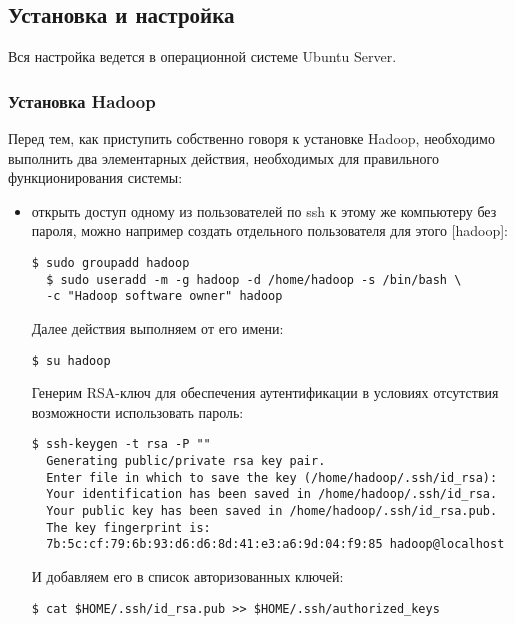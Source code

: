 \subsection{Установка и настройка}

Вся настройка ведется в операционной системе Ubuntu Server.

\subsubsection{Установка Hadoop}

Перед тем, как приступить собственно говоря к установке Hadoop, необходимо выполнить два элементарных действия, необходимых для правильного функционирования системы:

\begin{itemize}
  \item открыть доступ одному из пользователей по ssh к этому же компьютеру без пароля, можно например создать отдельного пользователя для этого [hadoop]:

  \begin{lstlisting}[label=lst:haddop1,caption=Создаем пользователя с правами]
  $ sudo groupadd hadoop
  $ sudo useradd -m -g hadoop -d /home/hadoop -s /bin/bash \
  -c "Hadoop software owner" hadoop
  \end{lstlisting}

  Далее действия выполняем от его имени:

  \begin{lstlisting}[label=lst:haddop2,caption=Логинимся под пользователем hadoop]
  $ su hadoop
  \end{lstlisting}

  Генерим RSA-ключ для обеспечения аутентификации в условиях отсутствия возможности использовать пароль:

  \begin{lstlisting}[label=lst:haddop3,caption=Генерим RSA-ключ]
  $ ssh-keygen -t rsa -P ""
  Generating public/private rsa key pair.
  Enter file in which to save the key (/home/hadoop/.ssh/id_rsa):
  Your identification has been saved in /home/hadoop/.ssh/id_rsa.
  Your public key has been saved in /home/hadoop/.ssh/id_rsa.pub.
  The key fingerprint is:
  7b:5c:cf:79:6b:93:d6:d6:8d:41:e3:a6:9d:04:f9:85 hadoop@localhost
  \end{lstlisting}

  И добавляем его в список авторизованных ключей:

  \begin{lstlisting}[label=lst:haddop4,caption=Добавляем его в список авторизованных ключей]
  $ cat $HOME/.ssh/id_rsa.pub >> $HOME/.ssh/authorized_keys
  \end{lstlisting}


\end{itemize}
